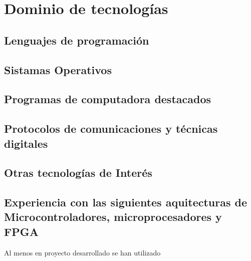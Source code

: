 
\section{Dominio de tecnologías}
   \subsection{Lenguajes de programación}
      \cvitem { \dicadvanced }{\proglangadvanced }
      \cvitem { \dicmedium   }{\proglangmedium   }
      \cvitem { \dicbasic    }{\proglangbasic    }

   \subsection{Sistamas Operativos}
      \cvitem { \dicadvanced } { \osadvanced }
      \cvitem { \dicmedium   } { \osmedium   }
      \cvitem { \dicbasic    } { \osbasic    }

   \subsection{Programas de computadora destacados}
      \cvitem { \dicadvanced } { \computerprogadvanced }
      \cvitem { \dicmedium   } { \computerprogmedium   }
      \cvitem { \dicbasic    } { \computerprogbasic    }

   \subsection{Protocolos de comunicaciones y técnicas digitales}
      \cvitem{\dicadvanced }{ \protocoladvanced }
      \cvitem{\dicmedium   }{ \protocolmedium   }
      \cvitem{\dicbasic    }{ \protocolbasic    }

   \subsection{Otras tecnologías de Interés}
      \cvitem{\dicadvanced} { \othertechadvanced }
      \cvitem{\dicmedium  } { \othertechmedium   }
      \cvitem{\dicbasic   } { \othertechbasic    }

   \subsection{Experiencia con las siguientes aquitecturas de Microcontroladores, microprocesadores y FPGA}
      \cvitem {} { Al menos en proyecto desarrollado se han utilizado}


